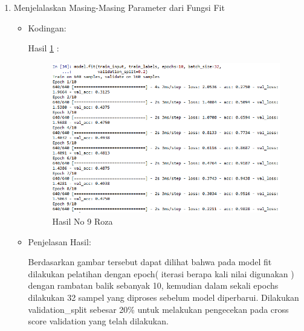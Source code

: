 \begin{enumerate}
\item Menjelalaskan Masing-Masing  Parameter dari Fungsi Fit
\begin{itemize}
\item Kodingan:

\par Hasil \ref{no9roza} :
\begin{figure}[!hbtp]
\centering
\includegraphics[scale=0.7]{figures/no9roza.png}
\caption{Hasil No 9 Roza}
\label{no9roza}
\end{figure}
\item Penjelasan Hasil:
\par Berdasarkan gambar tersebut dapat dilihat bahwa pada model fit dilakukan pelatihan dengan epoch(  iterasi berapa kali nilai digunakan ) dengan rambatan balik sebanyak 10, kemudian dalam sekali epochs dilakukan 32  sampel yang diproses sebelum model diperbarui. Dilakukan validation\_split sebesar 20\% untuk melakukan pengecekan pada cross score validation yang telah dilakukan.
\end{itemize}
\par


\end{enumerate}
